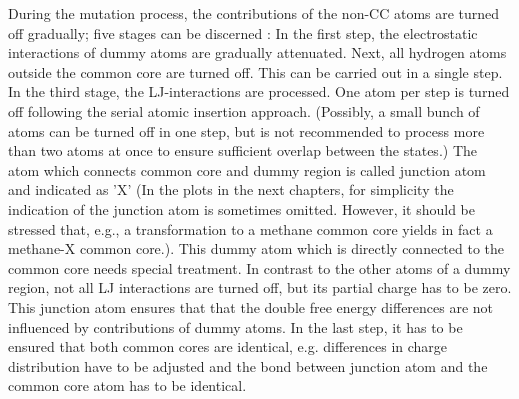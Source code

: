 During the mutation process, the contributions of the non-CC atoms are turned off gradually; five stages can be discerned \cite{Karwounopoulos.2022}:  In the first step, the electrostatic interactions of dummy atoms are gradually attenuated. Next, all hydrogen atoms outside the common core are turned off. This can be carried out in a single step.
In the third stage, the LJ-interactions are processed. One atom per step is turned off following the serial atomic insertion approach. (Possibly, a small bunch of atoms can be turned off in one step, but is not recommended to process more than two atoms at once to ensure sufficient overlap between the states.)
The atom which connects common core and dummy region is  called junction atom and indicated as 'X' \cite{Karwounopoulos.2022} (In the plots in the next chapters, for simplicity the indication of the junction atom is sometimes omitted. However, it should be stressed that, e.g., a transformation to a methane common core yields in fact a methane-X common core.). This dummy atom which is directly connected to the common core needs special treatment. In contrast to the other atoms of a dummy region, not all LJ interactions are turned off, but its partial charge has to be zero.\cite{Karwounopoulos.2022} This junction atom ensures that that the double free energy differences are not influenced by contributions of dummy atoms.\cite{Fleck.2021}
In the last step, it has to be ensured that both common cores are identical, e.g. differences in charge distribution have to be adjusted and the bond between junction atom and the common core atom has to be identical.

